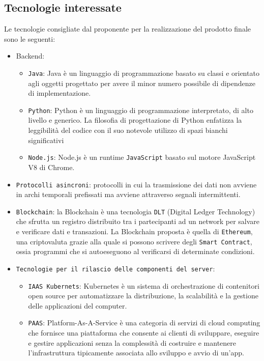 \subsection{Tecnologie interessate}
Le tecnologie consigliate dal proponente per la realizzazione del prodotto finale sono le seguenti:
\begin{itemize}
	\item Backend:
	      \begin{itemize}
		      \item \verb|Java|: Java è un linguaggio di programmazione basato su classi e orientato agli oggetti progettato per avere il minor numero possibile di dipendenze di implementazione.
		      \item \verb|Python|: Python è un linguaggio di programmazione interpretato, di alto livello e generico. La filosofia di progettazione di Python enfatizza la leggibilità del codice con il suo notevole utilizzo di spazi bianchi significativi
		      \item \verb|Node.js|: Node.js è un runtime \verb|JavaScript| basato sul motore JavaScript V8 di Chrome.
	      \end{itemize}
	\item \verb|Protocolli asincroni|: protocolli in cui la trasmissione dei dati non avviene in archi temporali prefissati ma avviene attraverso segnali intermittenti.
	\item \verb|Blockchain|: la Blockchain è una tecnologia \verb|DLT| (Digital Ledger Technology) che sfrutta un registro distribuito tra i partecipanti ad un network per salvare e verificare dati e transazioni. La Blockchain proposta è quella di \verb|Ethereum|, una criptovaluta grazie alla quale si possono scrivere degli \verb|Smart Contract|, ossia programmi che si autoeseguono al verificarsi di determinate condizioni.
	\item \verb|Tecnologie per il rilascio delle componenti del server|:
	      \begin{itemize}
		      \item \verb|IAAS Kubernets|: Kubernetes è un sistema di orchestrazione di contenitori open source per automatizzare la distribuzione, la scalabilità e la gestione delle applicazioni del computer.
		      \item \verb|PAAS|: Platform-As-A-Service è una categoria di servizi di cloud computing che fornisce una piattaforma che consente ai clienti di sviluppare, eseguire e gestire applicazioni senza la complessità di costruire e mantenere l'infrastruttura tipicamente associata allo sviluppo e avvio di un'app.
	      \end{itemize}
\end{itemize}

